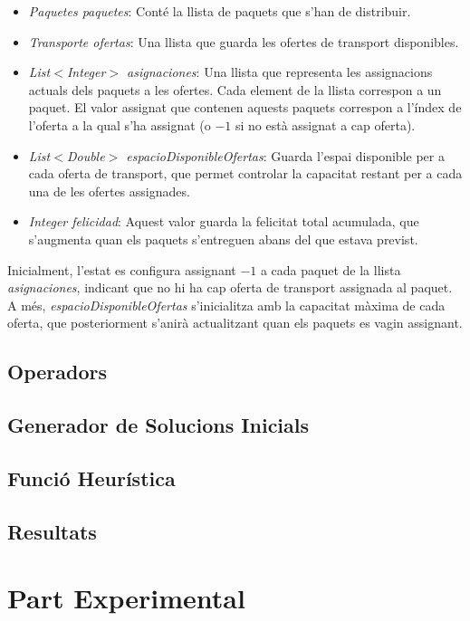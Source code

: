 \documentclass[a4paper]{article}
\begin{document}
		\begin{itemize}
		\item \emph{Paquetes paquetes}: Conté la llista de paquets que s'han de distribuir.
		\item \emph{Transporte ofertas}: Una llista que guarda les ofertes de transport disponibles.
		\item \emph{List$<$Integer$>$ asignaciones}: Una llista que representa les assignacions actuals dels paquets a les ofertes. Cada element de la llista correspon a un paquet. El valor assignat que contenen aquests paquets correspon a l'índex de l'oferta a la qual s'ha assignat (o \(-1\) si no està assignat a cap oferta).
		\item \emph{List$<$Double$>$ espacioDisponibleOfertas}: Guarda l'espai disponible per a cada oferta de transport, que permet controlar la capacitat restant per a cada una de les ofertes assignades.
		\item \emph{Integer felicidad}: Aquest valor guarda la felicitat total acumulada, que s'augmenta quan els paquets s'entreguen abans del que estava previst.
		\end{itemize}
		
	Inicialment, l'estat es configura assignant \(-1\) a cada paquet de la llista \emph{asignaciones}, indicant que no hi ha cap oferta de transport assignada al paquet. A més, \emph{espacioDisponibleOfertas} s'inicialitza amb la capacitat màxima de cada oferta, que posteriorment s'anirà actualitzant quan els paquets es vagin assignant.\\
	
	
	\subsection{Operadors}
	
	\subsection{Generador de Solucions Inicials}
	
	\subsection{Funció Heurística}
	
	\subsection{Resultats}
	
	\newpage
	\section{Part Experimental}
	
\end{document}
